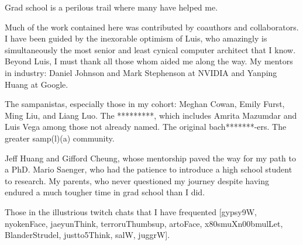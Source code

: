 Grad school is a perilous trail where many have helped me.

Much of the work contained here was contributed by coauthors and collaborators.
I have been guided by the inexorable optimism of Luis, who amazingly is simultaneously the most senior and least cynical computer architect that I know.
Beyond Luis, I must thank all those whom aided me along the way.
My mentors in industry: Daniel Johnson and Mark Stephenson at NVIDIA and Yanping Huang at Google.

The sampanistas, especially those in my cohort: Meghan Cowan, Emily Furst, Ming Liu, and Liang Luo.
The *********, which includes Amrita Mazumdar and Luis Vega among those not already named.
The original bach*******-ers. 
The greater samp(l)(a) community.

Jeff Huang and Gifford Cheung, whose mentorship paved the way for my path to a PhD.
Mario Saenger, who had the patience to introduce a high school student to research.
My parents, who never questioned my journey despite having endured a much tougher time in grad school than I did.

Those in the illustrious twitch chats that I have frequented [gypsy9W, nyokenFace, jaeyunThink, terroruThumbsup, artoFace, x80smuXn00bmulLet, BlanderStrudel, justto5Think, salW, juggrW].
